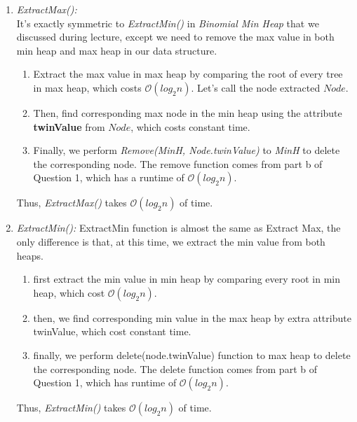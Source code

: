 \documentclass[10pt]{article}
\begin{document}
\begin{enumerate}
\begin{enumerate}
\item \textit{ExtractMax():}\\
It's exactly symmetric to \textit{ExtractMin()} in \textit{Binomial Min Heap} that we discussed during lecture, except we need to remove the max value in both min heap and max heap in our data structure.
\begin{enumerate}
\item Extract the max value in max heap by comparing the root of every tree in max heap, which costs $\mathcal{O}(log_2n)$. Let's call the node extracted $Node$.
\item Then, find corresponding max node in the min heap using the attribute \textbf{twinValue} from $Node$, which costs constant time.
\item Finally, we perform \textit{Remove(MinH, Node.twinValue)} to \textit{MinH} to delete the corresponding node. The remove function comes from part b of Question 1, which has a runtime of $\mathcal{O}(log_2n)$.
\end{enumerate}

Thus, \textit{ExtractMax()} takes $\mathcal{O}( log_2n)$ of time.

\item \textit{ExtractMin():}
ExtractMin function is almost the same as Extract Max, the only difference is that, at this time, we extract the min value from both heaps.
\begin{enumerate}
\item first extract the min value in min heap by comparing every root in min heap, which cost $\mathcal{O}(log_2n)$.
\item then, we find corresponding min value in the max heap by extra attribute twinValue, which cost constant time.
\item finally, we perform delete(node.twinValue) function to max heap to delete the corresponding node. The delete function comes from part b of Question 1, which has runtime of $\mathcal{O}(log_2n)$.
\end{enumerate}

Thus, \textit{ExtractMin()} takes $\mathcal{O}( log_2n)$ of time.
\end{enumerate}
\end{enumerate}
\newpage
\end{document}
